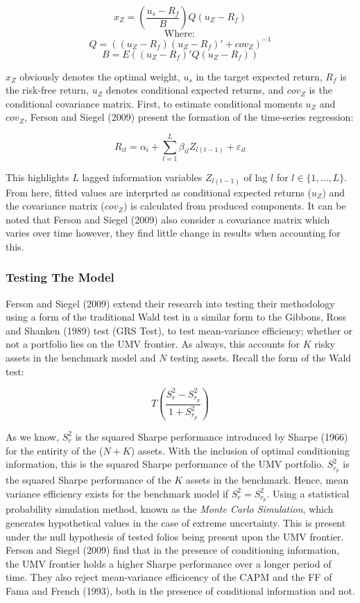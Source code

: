 \documentclass[11pt, english]{article}
\begin{document}
        $$x_Z=\left(\frac{u_s-R_f}{B}\right)Q(u_Z-R_f)$$
        $$\mathrm{Where:}$$
        $$Q=\left((u_Z-R_f)(u_Z-R_f)'+cov_Z\right)^{-1}$$
        $$B=E\left((u_Z-R_f)'Q(u_Z-R_f)\right)$$

        $x_Z$ obviously denotes the optimal weight, $u_s$ in the target expected return, $R_f$ is the risk-free return, $u_Z$ denotes conditional expected returns, and $cov_Z$ is the conditional covariance matrix. First, to estimate conditional moments $u_Z$ and $cov_Z$, Ferson and Siegel (2009) present the formation of the time-series regression:

        $$R_{it}=\alpha_i+\sum_{l=1}^L\beta_{il}Z_{l(t-1)}+\varepsilon_{it}$$

        This highlights $L$ lagged information variables $Z_{l(t-1)}$ of lag $l$ for $l\in\{1,...,L\}$. From here, fitted values are interprted as conditional expected returns ($u_Z$) and the covariance matrix ($cov_Z$) is calculated from produced components. It can be noted that Ferson and Siegel (2009) also consider a covariance matrix which varies over time however, they find little change in results when accounting for this.

                \subsubsection*{Testing The Model}

        Ferson and Siegel (2009) extend their research into testing their methodology using a form of the traditional Wald test in a similar form to the Gibbons, Ross and Shanken (1989) test (GRS Test), to test mean-variance efficiency; whether or not a portfolio lies on the UMV frontier. As always, this accounts for $K$ risky assets in the benchmark model and $N$ testing assets. Recall the form of the Wald test:

        $$T\left(\frac{S_r^2-S_{r_p}^2}{1+S_{r_p}^2}\right)$$

        As we know, $S_r^2$ is the squared Sharpe performance introduced by Sharpe (1966) for the entirity of the ($N+K$) assets. With the inclusion of optimal conditioning information, this is the squared Sharpe performance of the UMV portfolio. $S_{r_p}^2$ is the squared Sharpe performance of the $K$ assets in the benchmark. Hence, mean variance efficiency exists for the benchmark model if $S_r^2=S_{r_p}^2$. Using a statistical probability simulation method, known as the \textit{Monte Carlo Simulation}, which generates hypothetical values in the case of extreme uncertainty. This is present under the null hypothesis of tested folios being present upon the UMV frontier. Ferson and Siegel (2009) find that in the presence of conditioning information, the UMV frontier holds a higher Sharpe performance over a longer period of time. They also reject mean-variance efficicency of the CAPM and the FF of Fama and French (1993), both in the presence of conditional information and not.
                
\end{document}

